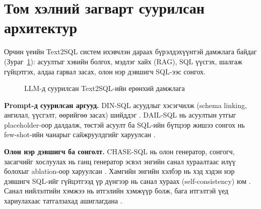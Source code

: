 \section{Том хэлний загварт суурилсан архитектур}
\label{sec:llm-arch}

Орчин үеийн Text2SQL систем ихэвчлэн дараах бүрэлдэхүүнтэй дамжлага байдаг (Зураг~\ref{fig:generic-pipeline}):
асуултыг хэвийн болгох, мэдлэг хайх (RAG), SQL үүсгэх, шалгаж гүйцэтгэх, алдаа гарвал засах, олон нэр дэвшигч SQL-ээс сонгох.

\begin{figure}[htbp]
\centering
{}
\caption{LLM-д суурилсан Text2SQL-ийн ерөнхий дамжлага}
\label{fig:generic-pipeline}
\end{figure}

\textbf{Prompt-д суурилсан аргууд.} DIN-SQL асуудлыг хэсэгчилж (schema linking, ангилал, үүсгэлт, өөрийгөө засах)
шийддэг \cite{pourreza_2023_din_sql}. DAIL-SQL нь асуултын утгыг placeholder-оор далдалж, төстэй асуулт ба SQL-ийн
бүтцээр жишээ сонгох нь few-shot-ийн чанарыг сайжруулдгийг харуулсан \cite{gao_2024_dail_sql}.

\textbf{Олон нэр дэвшигч ба сонголт.} CHASE-SQL нь олон генератор, сонгогч, засагчийг хослуулах нь ганц генератор
эсвэл энгийн санал хураалтаас илүү болохыг ablation-оор харуулсан \cite{pourreza_2024_chase_sql}. Хамгийн энгийн
хэлбэр нь хэд хэдэн нэр дэвшигч SQL-ийг гүйцэтгээд үр дүнгээр нь санал хураах (self-consistency) юм
\cite{wang_2023_self_consistency}. Санал нийлэлтийн хэмжээ нь итгэлийн хэмжүүр болж,
бага итгэлтэй үед хариулахаас татгалзахад ашиглагдана \cite{lee_2024_trustsql}.

